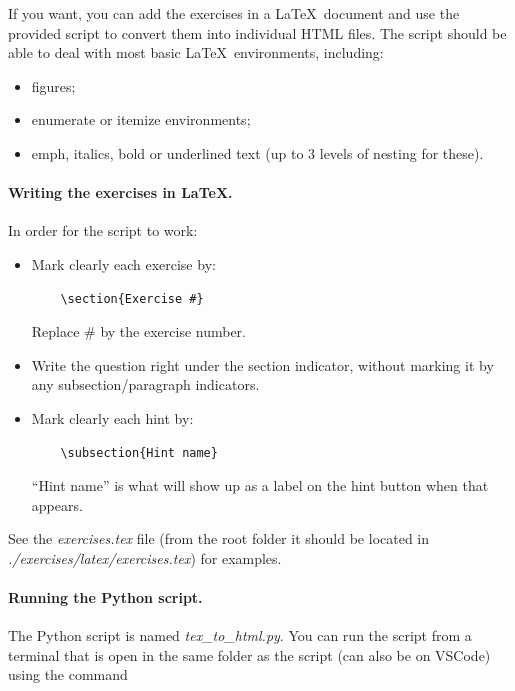 \documentclass[a4paper,10pt]{article}
\begin{document}
If you want, you can add the exercises in a \LaTeX\ document and use the provided script to convert them into individual HTML files. The script should be able to deal with most basic \LaTeX\ environments, including:
\begin{itemize}
    \item figures;
    \item enumerate or itemize environments;
    \item emph, italics, bold or underlined text (up to 3 levels of nesting for these).
\end{itemize}

\paragraph{Writing the exercises in \LaTeX.} In order for the script to work:
\begin{itemize}
    \item Mark clearly each exercise by:
    \begin{verbatim}    \section{Exercise #}\end{verbatim}
    Replace \# by the exercise number.

    \item Write the question right under the section indicator, without marking it by any subsection/paragraph indicators.

    \item Mark clearly each hint by:
    \begin{verbatim}    \subsection{Hint name}\end{verbatim}
    ``Hint name'' is what will show up as a label on the hint button when that appears.
\end{itemize} 
See the \emph{exercises.tex} file (from the root folder it should be located in \emph{./exercises/latex/exercises.tex}) for examples.

\paragraph{Running the Python script.} The Python script is named \emph{tex\_to\_html.py}. You can run the script from a terminal that is open in the same folder as the script (can also be on VSCode) using the command 
\end{document}
